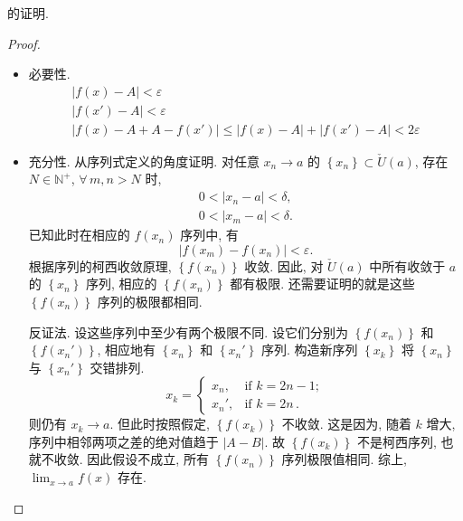 \documentclass{book}
\newcommand{\Any}{\forall\,}
\newcommand{\set}[1]{\left\{#1\right\}}
\newcommand{\abs}[1]{\left\lvert #1 \right\rvert}
\newcommand{\N}{\mathbb{N}}
\newcommand{\puncU}[1]{\check{U}\!\left( #1 \right)}
\renewcommand{\le}{\leqslant}
\numberwithin{equation}{section}
\numberwithin{figure}{section}
\theoremstyle{definition}
\begin{document}
 的\hypertarget{proof:FunctionLimitCauchy}{证明}.
\begin{proof}
  \leavevmode

  \begin{itemize}
    \item 必要性.
      \begin{gather*}
	\abs{f(x)-A}<\varepsilon\\
	\abs{f(x')-A}<\varepsilon\\
	\abs{f(x)-A+A-f(x')}\le\abs{f(x)-A}+\abs{f(x')-A}<2\varepsilon
      \end{gather*}
    \item 充分性.
      从序列式定义的角度证明.
      对任意 $x_n\to a$ 的 $\set{x_n}\subset\puncU{a}$, 存在 $N\in\N^+$, $\Any m,n>N$ 时, 
      \begin{gather*}
	0<\abs{x_n-a}<\delta,\\
	0<\abs{x_m-a}<\delta.
      \end{gather*}
      已知此时在相应的 $f(x_n)$ 序列中, 有
      \begin{equation*}
	\abs{f(x_m)-f(x_n)}<\varepsilon.
      \end{equation*}
      根据序列的柯西收敛原理, $\set{f(x_n)}$ 收敛.
      因此, 对 $\puncU{a}$ 中所有收敛于 $a$ 的 $\set{x_n}$ 序列, 相应的 $\set{f(x_n)}$ 都有极限.
      还需要证明的就是这些 $\set{f(x_n)}$ 序列的极限都相同.

      反证法. 设这些序列中至少有两个极限不同. 设它们分别为 $\set{f(x_n)}$ 和 $\set{f(x_n')}$, 相应地有 $\set{x_n}$ 和 $\set{x_n'}$ 序列.
      构造新序列 $\set{x_k}$ 将 $\set{x_n}$ 与 $\set{x_n'}$ 交错排列.
      \begin{equation*}
	x_k=
	\begin{cases}
	  x_n,& \text{if } k=2n-1;\\
	  x_n',& \text{if } k=2n\,.
	\end{cases}
      \end{equation*}
      则仍有 $x_k\to a$.
      但此时按照假定, $\set{f(x_k)}$ 不收敛.
      这是因为, 随着 $k$ 增大, 序列中相邻两项之差的绝对值趋于 $\abs{A-B}$. 故 $\set{f(x_k)}$ 不是柯西序列, 也就不收敛. 因此假设不成立, 所有 $\set{f(x_n)}$ 序列极限值相同. 综上, $\lim_{x\to a}f(x)$ 存在.
  \end{itemize}
\end{proof}
\end{document}

